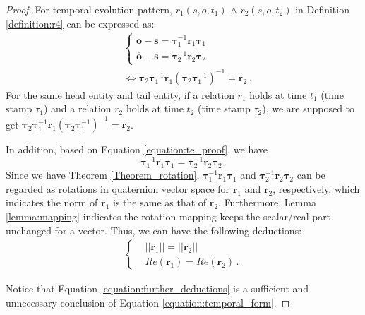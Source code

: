 \documentclass[11pt]{article}
\newcommand{\vect}[1]{\mathbf{#1}\xspace}
\newcommand{\vects}{\vect{s}\xspace}
\newcommand{\vecto}{\vect{o}\xspace}
\begin{document}
\begin{proof}

For temporal-evolution pattern, $ r_1(s,o,t_1)$ $\land$ $ r_2(s,o,t_2)$ in Definition \ref{definition:r4} can be expressed as:
\begin{equation}\label{equation:te_proof}
\begin{aligned}
& \left\{  
     \begin{aligned}
     \overline{\vecto} - \vects  = \pmb{\tau}_1^{-1} \vect{r}_1 \pmb{\tau}_1 \\
    \overline{\vecto} - \vects  = \pmb{\tau}_2^{-1} \vect{r}_2 \pmb{\tau}_2
    \end{aligned}
\right. 
\\
& \Leftrightarrow
\pmb{\tau}_2 \pmb{\tau}_1^{-1} \vect{r}_1 (\pmb{\tau}_2 \pmb{\tau}_1^{-1})^{-1} = \vect{r}_2 \, .
\end{aligned}
\end{equation}
For the same head entity and tail entity, if a relation $r_1$ holds at time $t_1$ (time stamp $\tau_1$) and a relation $r_2$ holds at time $t_2$ (time stamp $\tau_2$), we are supposed to get  $\pmb{\tau}_2 \pmb{\tau}_1^{-1} \vect{r}_1 (\pmb{\tau}_2 \pmb{\tau}_1^{-1})^{-1} = \vect{r}_2$. 

In addition, based on Equation \ref{equation:te_proof}, we have
\begin{equation}\label{equation:temporal_form}
\pmb{\tau}_1^{-1} \vect{r}_1 \pmb{\tau}_1 = \pmb{\tau}_2^{-1} \vect{r}_2 \pmb{\tau}_2 \, .
\end{equation}
Since we have Theorem \ref{Theorem_rotation}, $\pmb{\tau}_1^{-1} \vect{r}_1 \pmb{\tau}_1$ and $\pmb{\tau}_2^{-1} \vect{r}_2 \pmb{\tau}_2$ can be regarded as rotations in quaternion vector space for $\vect{r}_1$ and $\vect{r}_2$, respectively, which indicates the norm of $\vect{r}_1$ is the same as that of $\vect{r}_2$. Furthermore, Lemma \ref{lemma:mapping} indicates the rotation mapping keeps the scalar/real part unchanged for a vector. Thus, we can have the following deductions:
\begin{equation}
\label{equation:further_deductions}
\begin{aligned}
     \left\{  
     \begin{aligned}
    & \vert \vert \vect{r}_1 \vert \vert = \vert \vert \vect{r}_2 \vert \vert \\
   & Re(\vect{r}_1) =  Re(\vect{r}_2) \,.
    \end{aligned}
\right. 
\end{aligned}
\end{equation}

Notice that Equation \ref{equation:further_deductions} is a sufficient and unnecessary conclusion of Equation \ref{equation:temporal_form}.
\end{proof}
\end{document}
